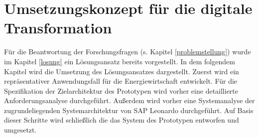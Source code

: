 \section{Umsetzungskonzept für die digitale Transformation}

Für die Beantwortung der Forschungsfragen (s. Kapitel \ref{problemstellung}) wurde im Kapitel \ref{losung} ein Lösungsansatz bereits vorgestellt. In dem folgendem Kapitel wird die Umsetzung des Lösungsansatzes dargestellt. Zuerst wird ein repräsentativer Anwendungsfall für die Energiewirtschaft entwickelt. Für die Spezifikation der Zielarchitektur des Prototypen wird vorher eine detaillierte Anforderungsanalyse durchgeführt. Außerdem wird vorher eine Systemanalyse der zugrundeliegenden Systemarchitektur von SAP Leonardo durchgeführt. Auf Basis dieser Schritte wird schließlich die das System des Prototypen entworfen und umgesetzt. 

 
 
 



